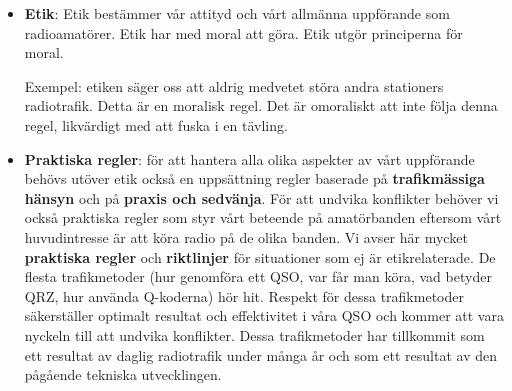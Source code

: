 \begin{itemize}
\item \textbf{Etik}: Etik bestämmer vår attityd och vårt allmänna uppförande
  som radioamatörer.
  Etik har med moral att göra.
  Etik utgör principerna för moral.

  Exempel: etiken säger oss att aldrig medvetet störa andra stationers
  radiotrafik.
  Detta är en moralisk regel.
  Det är omoraliskt att inte följa denna regel, likvärdigt med att fuska i en
  tävling.
\item \textbf{Praktiska regler}: för att hantera alla olika aspekter av
  vårt uppförande behövs utöver etik också en uppsättning regler baserade på
  \textbf{trafikmässiga hänsyn} och på \textbf{praxis och sedvänja}.
  För att undvika konflikter behöver vi också praktiska regler som styr
  vårt beteende på amatörbanden eftersom vårt huvudintresse är att köra
  radio på de olika banden.
  Vi avser här mycket \textbf{praktiska regler} och \textbf{riktlinjer} för
  situationer som ej är etikrelaterade.
  De flesta trafikmetoder (hur genomföra ett QSO, var får man köra,
  vad betyder QRZ, hur använda Q-koderna) hör hit.
  Respekt för dessa trafikmetoder säkerställer optimalt resultat och
  effektivitet i våra QSO och kommer att vara nyckeln till att undvika
  konflikter.
  Dessa trafikmetoder har tillkommit som ett resultat av daglig radiotrafik
  under många år och som ett resultat av den pågående tekniska utvecklingen.
\end{itemize}
